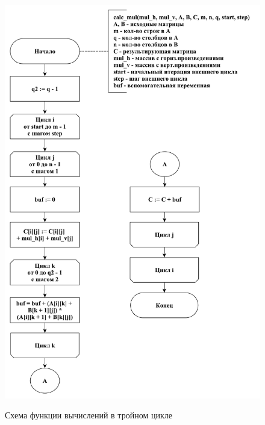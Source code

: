 \documentclass[a4paper,12pt]{article}
\begin{document}
	    	    \begin{figure}[h!]
	    	\begin{center}
	    		{\includegraphics[scale = 0.5]{schema04.pdf}}
	    		\caption{Схема функции вычислений в тройном цикле}
	    		\label{fig:schema_m}
	    	\end{center}
	    \end{figure}
	    
\end{document}
